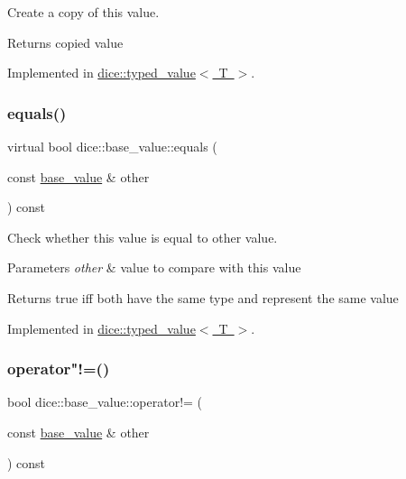 Create a copy of this value. 

\begin{DoxyReturn}{Returns}
copied value 
\end{DoxyReturn}


Implemented in \mbox{\hyperlink{classdice_1_1typed__value_a54490141b25b17213989fd2e859b4f59}{dice\+::typed\+\_\+value$<$ T $>$}}.

\mbox{\label{classdice_1_1base__value_a81269be4c101eeef6d48810823e1835c}} 
\subsubsection{\texorpdfstring{equals()}{equals()}}
{\footnotesize\ttfamily virtual bool dice\+::base\+\_\+value\+::equals (\begin{DoxyParamCaption}\item[{const \mbox{\hyperlink{classdice_1_1base__value}{base\+\_\+value}} \&}]{other }\end{DoxyParamCaption}) const\hspace{0.3cm}{\ttfamily [pure virtual]}}



Check whether this value is equal to other value. 


\begin{DoxyParams}{Parameters}
{\em other} & value to compare with this value\\
\hline
\end{DoxyParams}
\begin{DoxyReturn}{Returns}
true iff both have the same type and represent the same value 
\end{DoxyReturn}


Implemented in \mbox{\hyperlink{classdice_1_1typed__value_aeb5c87839a5e3ecb7beac6abc05e6701}{dice\+::typed\+\_\+value$<$ T $>$}}.

\mbox{\label{classdice_1_1base__value_a6a05109afbb4b9a2c77887d76e7edbab}} 
\subsubsection{\texorpdfstring{operator"!=()}{operator!=()}}
{\footnotesize\ttfamily bool dice\+::base\+\_\+value\+::operator!= (\begin{DoxyParamCaption}\item[{const \mbox{\hyperlink{classdice_1_1base__value}{base\+\_\+value}} \&}]{other }\end{DoxyParamCaption}) const\hspace{0.3cm}{\ttfamily [inline]}}



